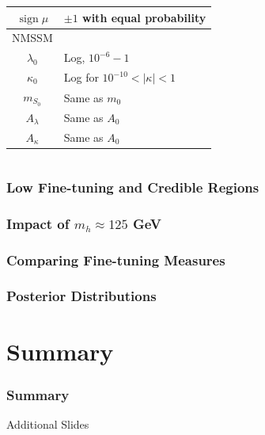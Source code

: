 \documentclass[10pt,aspectratio=169]{beamer}
\DeclareMathOperator{\sign}{sign}
\newcommand{\mzero}{\ensuremath{m_0}\xspace}
\newcommand{\azero}{\ensuremath{A_0}\xspace}
\newcommand{\sgnmu}{\ensuremath{\sign \mu}\xspace}
\begin{document}
\begin{frame}
\begin{columns}[t]
\begin{column}{0.5\textwidth}
\begin{table}
\begin{tabularx}{0.8\textwidth}{cX}
          \sgnmu & $\pm1$ with equal probability\\
          \midrule
          NMSSM\\
          \midrule
          $\lambda_0$ & Log, $10^{-6}-1$\\
          $\kappa_0$ & Log for $10^{-10}< |\kappa| < 1$\\
          $m_{S_0}$ & Same as $\mzero$\\
          $A_\lambda$ & Same as \azero\\
          $A_\kappa$ & Same as \azero\\
          \bottomrule
        \end{tabularx}
      \end{table}
    \end{column}
  \end{columns}
\end{frame}

\begin{frame}
  \frametitle{Low Fine-tuning and Credible Regions}
\end{frame}

\begin{frame}
  \frametitle{Impact of $m_h \approx 125$ GeV}
\end{frame}

\begin{frame}
  \frametitle{Comparing Fine-tuning Measures}
\end{frame}

\begin{frame}
  \frametitle{Posterior Distributions}
\end{frame}

\section{Summary}

\begin{frame}
  \frametitle{Summary}
\end{frame}

\appendix

\begin{frame}
  \begin{center}
    {
      \Large
      Additional Slides
    }
  \end{center}
\end{frame}
\end{document}
